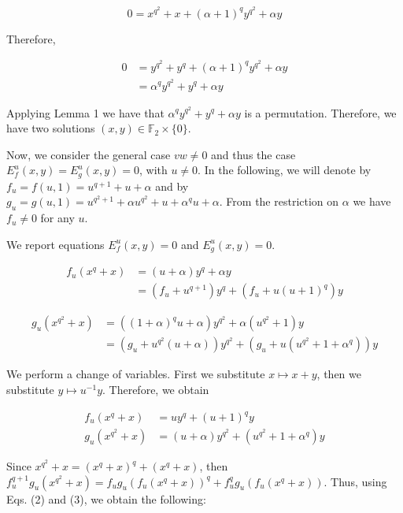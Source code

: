 \documentclass[10pt]{article}
\begin{document}
$$
0=x^{q^{2}}+x+(\alpha+1)^{q} y^{q^{2}}+\alpha y
$$

Therefore,

$$
\begin{aligned}
0 & =y^{q^{2}}+y^{q}+(\alpha+1)^{q} y^{q^{2}}+\alpha y \\
& =\alpha^{q} y^{q^{2}}+y^{q}+\alpha y
\end{aligned}
$$

Applying Lemma 1 we have that $\alpha^{q} y^{q^{2}}+y^{q}+\alpha y$ is a permutation. Therefore, we have two solutions $(x, y) \in \mathbb{F}_{2} \times\{0\}$.

Now, we consider the general case $v w \neq 0$ and thus the case $E_{f}^{u}(x, y)=E_{g}^{u}(x, y)=0$, with $u \neq 0$. In the following, we will denote by $f_{u}=f(u, 1)=u^{q+1}+u+\alpha$ and by $g_{u}=g(u, 1)=u^{q^{2}+1}+\alpha u^{q^{2}}+u+\alpha^{q} u+\alpha$. From the restriction on $\alpha$ we have $f_{u} \neq 0$ for any $u$.

We report equations $E_{f}^{u}(x, y)=0$ and $E_{g}^{u}(x, y)=0$.

$$
\begin{aligned}
f_{u}\left(x^{q}+x\right) & =(u+\alpha) y^{q}+\alpha y \\
& =\left(f_{u}+u^{q+1}\right) y^{q}+\left(f_{u}+u(u+1)^{q}\right) y
\end{aligned}
$$

$$
\begin{aligned}
g_{u}\left(x^{q^{2}}+x\right) & =\left((1+\alpha)^{q} u+\alpha\right) y^{q^{2}}+\alpha\left(u^{q^{2}}+1\right) y \\
& =\left(g_{u}+u^{q^{2}}(u+\alpha)\right) y^{q^{2}}+\left(g_{u}+u\left(u^{q^{2}}+1+\alpha^{q}\right)\right) y
\end{aligned}
$$

We perform a change of variables. First we substitute $x \mapsto x+y$, then we substitute $y \mapsto u^{-1} y$. Therefore, we obtain


\begin{align*}
f_{u}\left(x^{q}+x\right) & =u y^{q}+(u+1)^{q} y  \tag{2}\\
g_{u}\left(x^{q^{2}}+x\right) & =(u+\alpha) y^{q^{2}}+\left(u^{q^{2}}+1+\alpha^{q}\right) y \tag{3}
\end{align*}


Since $x^{q^{2}}+x=\left(x^{q}+x\right)^{q}+\left(x^{q}+x\right)$, then $f_{u}^{q+1} g_{u}\left(x^{q^{2}}+x\right)=f_{u} g_{u}\left(f_{u}\left(x^{q}+x\right)\right)^{q}+ f_{u}^{q} g_{u}\left(f_{u}\left(x^{q}+x\right)\right)$. Thus, using Eqs. (2) and (3), we obtain the following:
\end{document}
